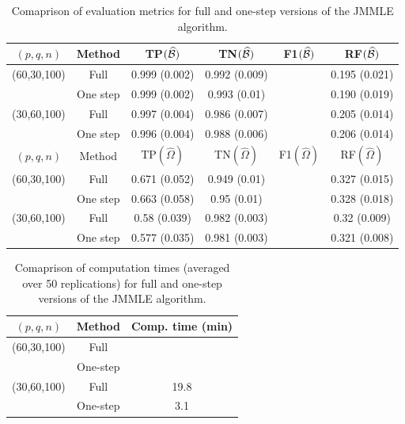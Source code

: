 \begin{table}
\centering
    \begin{tabular}{cccccc}
    \hline
    $(p,q,n)$     & Method         & TP$(\widehat {{\cal{B}}})$            & TN$(\widehat {{\cal{B}}})$            & F1$(\widehat {{\cal{B}}})$ & RF$(\widehat {{\cal{B}}})$             \\\hline
    (60,30,100) & Full         & 0.999 (0.002) & 0.992 (0.009) & ~   & 0.195 (0.021)                \\
    ~           & One step     & 0.999 (0.002) &  0.993 (0.01) & ~   & 0.190 (0.019)                 \\
    (30,60,100) & Full          & 0.997 (0.004) & 0.986 (0.007) & ~   & 0.205 (0.014)               \\
    ~           & One step & 0.996 (0.004) & 0.988 (0.006) & ~   & 0.206 (0.014)             \\ \hline
    \hline
    $(p,q,n)$     & Method         & TP$(\widehat \Omega)$            & TN$(\widehat \Omega)$            & F1$(\widehat \Omega)$ & RF$(\widehat \Omega)$            \\\hline
    (60,30,100) & Full         & 0.671 (0.052) & 0.949 (0.01) & ~   & 0.327 (0.015)                \\
    ~           & One step     & 0.663 (0.058) & 0.95 (0.01)   & ~   & 0.328 (0.018)               \\
    (30,60,100) & Full          & 0.58 (0.039) & 0.982 (0.003) & ~   & 0.32 (0.009)             \\
    ~           & One step & 0.577 (0.035) & 0.981 (0.003)  & ~   & 0.321 (0.008)            \\ \hline
    \end{tabular}
    \caption{Comaprison of evaluation metrics for full and one-step versions of the JMMLE algorithm.}
    \label{table:simtable41}
\end{table}

\begin{table}[ht]
\centering
  \begin{tabular}{ccc}
    \hline
    $(p,q,n)$     & Method   & Comp. time (min) \\ \hline
    (60,30,100) & Full     & ~                \\ 
    ~           & One-step & ~                \\ \hline
    (30,60,100) & Full     & 19.8             \\ 
    ~           & One-step & 3.1              \\ \hline
    \end{tabular}
    \caption{Comaprison of computation times (averaged over 50 replications) for full and one-step versions of the JMMLE algorithm.}
    \label{table:simtable42}
\end{table}


